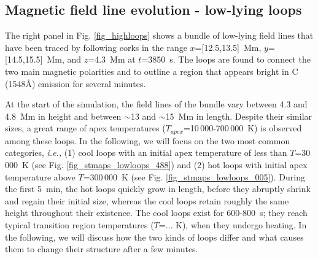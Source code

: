 \documentclass{aa}
\begin{document}
{\subsection{Magnetic field line evolution - low-lying loops}\label{section_TR_loops}
The right panel in Fig. \ref{fig_highloops} shows a bundle of low-lying field lines that have been traced by following corks in the range $x$=[12.5,13.5]~Mm, $y$=[14.5,15.5]~Mm, and $z$=4.3~Mm at $t$=3850~s. 
The loops are found to connect the two main magnetic polarities and to outline a region that appears bright in C\,{} (1548\AA) emission for several minutes. 

At the start of the simulation, the field lines of the bundle vary between 4.3 and 4.8~Mm in height and between $\sim$13 and $\sim$15~Mm in length. Despite their similar sizes, a great range of apex temperatures ($T_{apex}$=10\,000-700\,000~K) is observed among these loops.
 In the following, we will focus on the two most common categories, {\emph{i.e.,}} (1) cool loops with an initial apex temperature of less than $T$=30\,000~K (see Fig. \ref{fig_stmaps_lowloops_488}) and (2) hot loops with initial apex temperature above $T$=300\,000~K (see Fig. \ref{fig_stmaps_lowloops_005}). 
During the first 5~min, the hot loops quickly grow in length, before they abruptly shrink and regain their initial size, whereas the cool loops retain roughly the same height throughout their existence. The cool loops exist for 600-800~s; they reach typical transition region temperatures ($T$=... K), when they undergo heating. In the following, we will discuss how the two kinds of loops differ and what causes them to change their structure after a few minutes.


}
\end{document}
